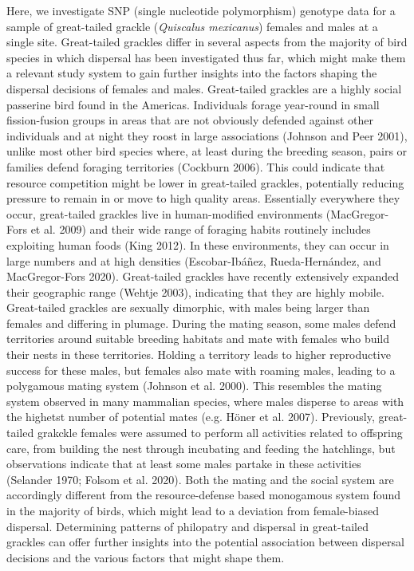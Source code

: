 \documentclass[
]{article}
\begin{document}
Here, we investigate SNP (single nucleotide polymorphism) genotype data
for a sample of great-tailed grackle (\emph{Quiscalus mexicanus})
females and males at a single site. Great-tailed grackles differ in
several aspects from the majority of bird species in which dispersal has
been investigated thus far, which might make them a relevant study
system to gain further insights into the factors shaping the dispersal
decisions of females and males. Great-tailed grackles are a highly
social passerine bird found in the Americas. Individuals forage
year-round in small fission-fusion groups in areas that are not
obviously defended against other individuals and at night they roost in
large associations (Johnson and Peer 2001), unlike most other bird
species where, at least during the breeding season, pairs or families
defend foraging territories (Cockburn 2006). This could indicate that
resource competition might be lower in great-tailed grackles,
potentially reducing pressure to remain in or move to high quality
areas. Essentially everywhere they occur, great-tailed grackles live in
human-modified environments (MacGregor-Fors et al. 2009) and their wide
range of foraging habits routinely includes exploiting human foods (King
2012). In these environments, they can occur in large numbers and at
high densities (Escobar-Ibáñez, Rueda-Hernández, and MacGregor-Fors
2020). Great-tailed grackles have recently extensively expanded their
geographic range (Wehtje 2003), indicating that they are highly mobile.
Great-tailed grackles are sexually dimorphic, with males being larger
than females and differing in plumage. During the mating season, some
males defend territories around suitable breeding habitats and mate with
females who build their nests in these territories. Holding a territory
leads to higher reproductive success for these males, but females also
mate with roaming males, leading to a polygamous mating system (Johnson
et al. 2000). This resembles the mating system observed in many
mammalian species, where males disperse to areas with the highetst
number of potential mates (e.g. Höner et al. 2007). Previously,
great-tailed grakckle females were assumed to perform all activities
related to offspring care, from building the nest through incubating and
feeding the hatchlings, but observations indicate that at least some
males partake in these activities (Selander 1970; Folsom et al. 2020).
Both the mating and the social system are accordingly different from the
resource-defense based monogamous system found in the majority of birds,
which might lead to a deviation from female-biased dispersal.
Determining patterns of philopatry and dispersal in great-tailed
grackles can offer further insights into the potential association
between dispersal decisions and the various factors that might shape
them.
\end{document}
